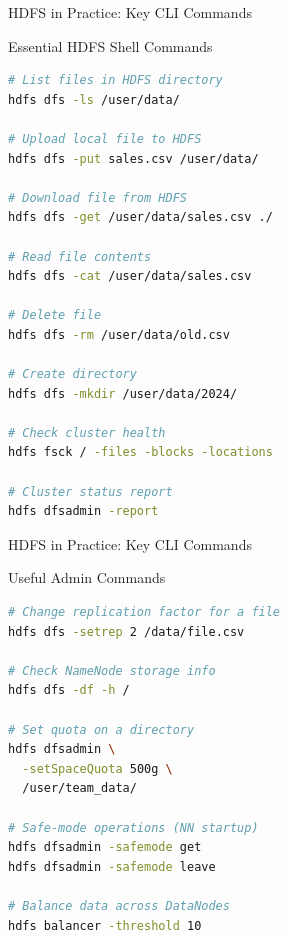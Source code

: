 \documentclass[aspectratio=169,10pt]{beamer}
\begin{document}
\begin{frame}[fragile]{HDFS in Practice: Key CLI Commands}
 
      \begin{block}{Essential HDFS Shell Commands}
        \vspace{4pt}
           \footnotesize
        \begin{lstlisting}[language=bash]
# List files in HDFS directory
hdfs dfs -ls /user/data/

# Upload local file to HDFS
hdfs dfs -put sales.csv /user/data/

# Download file from HDFS
hdfs dfs -get /user/data/sales.csv ./

# Read file contents
hdfs dfs -cat /user/data/sales.csv

# Delete file
hdfs dfs -rm /user/data/old.csv

# Create directory
hdfs dfs -mkdir /user/data/2024/

# Check cluster health
hdfs fsck / -files -blocks -locations

# Cluster status report
hdfs dfsadmin -report
        \end{lstlisting}
      \end{block}

    
\end{frame}

\begin{frame}[fragile]{HDFS in Practice: Key CLI Commands}
   
      \begin{exampleblock}{Useful Admin Commands}
        \vspace{4pt}
        \footnotesize
        \begin{lstlisting}[language=bash]
# Change replication factor for a file
hdfs dfs -setrep 2 /data/file.csv

# Check NameNode storage info
hdfs dfs -df -h /

# Set quota on a directory
hdfs dfsadmin \
  -setSpaceQuota 500g \
  /user/team_data/

# Safe-mode operations (NN startup)
hdfs dfsadmin -safemode get
hdfs dfsadmin -safemode leave

# Balance data across DataNodes
hdfs balancer -threshold 10
        \end{lstlisting}
      \end{exampleblock}
     
 
\end{frame}
\end{document}
